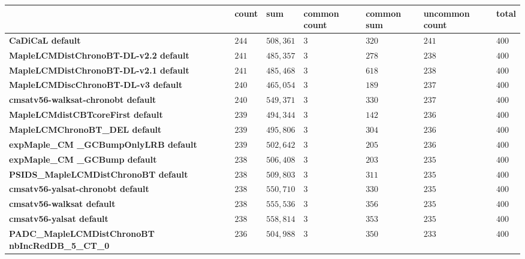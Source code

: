 \begin{tabular}{lllllll}
\toprule
{} &  count &          sum & common count & common sum & uncommon count &  total \\
\midrule
\textbf{CaDiCaL default                               } &  $244$ &    $508,361$ &          $3$ &      $320$ &          $241$ &  $400$ \\
\textbf{MapleLCMDistChronoBT-DL-v2.2 default          } &  $241$ &    $485,357$ &          $3$ &      $278$ &          $238$ &  $400$ \\
\textbf{MapleLCMDistChronoBT-DL-v2.1 default          } &  $241$ &    $485,468$ &          $3$ &      $618$ &          $238$ &  $400$ \\
\textbf{MapleLCMDiscChronoBT-DL-v3 default            } &  $240$ &    $465,054$ &          $3$ &      $189$ &          $237$ &  $400$ \\
\textbf{cmsatv56-walksat-chronobt default             } &  $240$ &    $549,371$ &          $3$ &      $330$ &          $237$ &  $400$ \\
\textbf{MapleLCMdistCBTcoreFirst default              } &  $239$ &    $494,344$ &          $3$ &      $142$ &          $236$ &  $400$ \\
\textbf{MapleLCMChronoBT_DEL default                  } &  $239$ &    $495,806$ &          $3$ &      $304$ &          $236$ &  $400$ \\
\textbf{expMaple_CM _GCBumpOnlyLRB default            } &  $239$ &    $502,642$ &          $3$ &      $205$ &          $236$ &  $400$ \\
\textbf{expMaple_CM _GCBump default                   } &  $238$ &    $506,408$ &          $3$ &      $203$ &          $235$ &  $400$ \\
\textbf{PSIDS_MapleLCMDistChronoBT default            } &  $238$ &    $509,803$ &          $3$ &      $311$ &          $235$ &  $400$ \\
\textbf{cmsatv56-yalsat-chronobt default              } &  $238$ &    $550,710$ &          $3$ &      $330$ &          $235$ &  $400$ \\
\textbf{cmsatv56-walksat default                      } &  $238$ &    $555,536$ &          $3$ &      $356$ &          $235$ &  $400$ \\
\textbf{cmsatv56-yalsat default                       } &  $238$ &    $558,814$ &          $3$ &      $353$ &          $235$ &  $400$ \\
\textbf{PADC_MapleLCMDistChronoBT nbIncRedDB_5_CT_0   } &  $236$ &    $504,988$ &          $3$ &      $350$ &          $233$ &  $400$ \\

\end{tabular}
